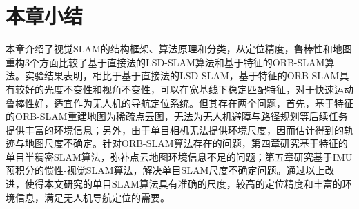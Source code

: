 \section{本章小结}
本章介绍了视觉SLAM的结构框架、算法原理和分类，从定位精度，鲁棒性和地图重构3个方面比较了基于直接法的LSD-SLAM算法和基于特征的ORB-SLAM算法。实验结果表明，相比于基于直接法的LSD-SLAM，基于特征的ORB-SLAM具有较好的光度不变性和视角不变性，可以在宽基线下稳定匹配特征，对于快速运动鲁棒性好，适宜作为无人机的导航定位系统。但其存在两个问题，首先，基于特征的ORB-SLAM重建地图为稀疏点云图，无法为无人机避障与路径规划等后续任务提供丰富的环境信息；另外，由于单目相机无法提供环境尺度，因而估计得到的轨迹与地图尺度不确定。针对ORB-SLAM算法存在的问题，第四章研究基于特征的单目半稠密SLAM算法，弥补点云地图环境信息不足的问题；第五章研究基于IMU预积分的惯性-视觉SLAM算法，解决单目SLAM尺度不确定问题。通过以上改进，使得本文研究的单目SLAM算法具有准确的尺度，较高的定位精度和丰富的环境信息，满足无人机导航定位的需要。


